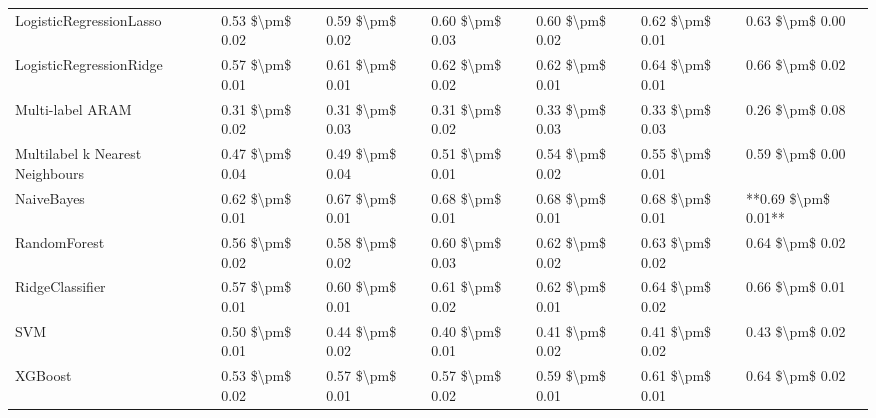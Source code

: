 \begin{tabular}{lllllll}
LogisticRegressionLasso         &  0.53 \$\textbackslash pm\$ 0.02 &           0.59 \$\textbackslash pm\$ 0.02 &       0.60 \$\textbackslash pm\$ 0.03 &        0.60 \$\textbackslash pm\$ 0.02 &                         0.62 \$\textbackslash pm\$ 0.01 &      0.63 \$\textbackslash pm\$ 0.00 \\
LogisticRegressionRidge         &  0.57 \$\textbackslash pm\$ 0.01 &           0.61 \$\textbackslash pm\$ 0.01 &       0.62 \$\textbackslash pm\$ 0.02 &        0.62 \$\textbackslash pm\$ 0.01 &                         0.64 \$\textbackslash pm\$ 0.01 &      0.66 \$\textbackslash pm\$ 0.02 \\
Multi-label ARAM                &  0.31 \$\textbackslash pm\$ 0.02 &           0.31 \$\textbackslash pm\$ 0.03 &       0.31 \$\textbackslash pm\$ 0.02 &        0.33 \$\textbackslash pm\$ 0.03 &                         0.33 \$\textbackslash pm\$ 0.03 &      0.26 \$\textbackslash pm\$ 0.08 \\
Multilabel k Nearest Neighbours &  0.47 \$\textbackslash pm\$ 0.04 &           0.49 \$\textbackslash pm\$ 0.04 &       0.51 \$\textbackslash pm\$ 0.01 &        0.54 \$\textbackslash pm\$ 0.02 &                         0.55 \$\textbackslash pm\$ 0.01 &      0.59 \$\textbackslash pm\$ 0.00 \\
NaiveBayes                      &  0.62 \$\textbackslash pm\$ 0.01 &           0.67 \$\textbackslash pm\$ 0.01 &       0.68 \$\textbackslash pm\$ 0.01 &        0.68 \$\textbackslash pm\$ 0.01 &                         0.68 \$\textbackslash pm\$ 0.01 &  **0.69 \$\textbackslash pm\$ 0.01** \\
RandomForest                    &  0.56 \$\textbackslash pm\$ 0.02 &           0.58 \$\textbackslash pm\$ 0.02 &       0.60 \$\textbackslash pm\$ 0.03 &        0.62 \$\textbackslash pm\$ 0.02 &                         0.63 \$\textbackslash pm\$ 0.02 &      0.64 \$\textbackslash pm\$ 0.02 \\
RidgeClassifier                 &  0.57 \$\textbackslash pm\$ 0.01 &           0.60 \$\textbackslash pm\$ 0.01 &       0.61 \$\textbackslash pm\$ 0.02 &        0.62 \$\textbackslash pm\$ 0.01 &                         0.64 \$\textbackslash pm\$ 0.02 &      0.66 \$\textbackslash pm\$ 0.01 \\
SVM                             &  0.50 \$\textbackslash pm\$ 0.01 &           0.44 \$\textbackslash pm\$ 0.02 &       0.40 \$\textbackslash pm\$ 0.01 &        0.41 \$\textbackslash pm\$ 0.02 &                         0.41 \$\textbackslash pm\$ 0.02 &      0.43 \$\textbackslash pm\$ 0.02 \\
XGBoost                         &  0.53 \$\textbackslash pm\$ 0.02 &           0.57 \$\textbackslash pm\$ 0.01 &       0.57 \$\textbackslash pm\$ 0.02 &        0.59 \$\textbackslash pm\$ 0.01 &                         0.61 \$\textbackslash pm\$ 0.01 &      0.64 \$\textbackslash pm\$ 0.02 \\
\bottomrule
\end{tabular}
